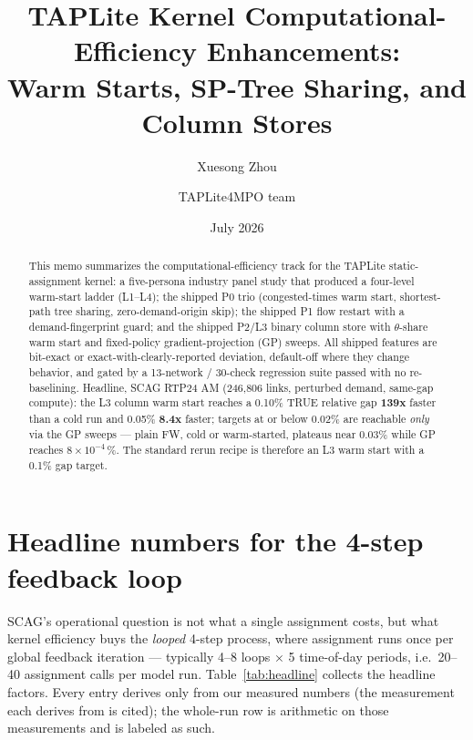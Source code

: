 \documentclass[10pt]{article}
\title{TAPLite Kernel Computational-Efficiency Enhancements:\\
Warm Starts, SP-Tree Sharing, and Column Stores}
\author{Xuesong Zhou \and TAPLite4MPO team}
\date{July 2026}
\begin{document}
\maketitle

\begin{abstract}
\noindent This memo summarizes the computational-efficiency track for the TAPLite
static-assignment kernel: a five-persona industry panel study that produced a
four-level warm-start ladder (L1--L4); the shipped P0 trio (congested-times warm
start, shortest-path tree sharing, zero-demand-origin skip); the shipped P1
flow restart with a demand-fingerprint guard; and the shipped P2/L3 binary
column store with $\theta$-share warm start and fixed-policy
gradient-projection (GP) sweeps. All shipped features are bit-exact or
exact-with-clearly-reported deviation, default-off where they change behavior,
and gated by a 13-network / 30-check regression suite passed with no
re-baselining. Headline, SCAG RTP24 AM (246{,}806 links, perturbed demand,
same-gap compute): the L3 column warm start reaches a 0.10\% TRUE relative gap
\textbf{139x} faster than a cold run and 0.05\% \textbf{8.4x} faster; targets
at or below 0.02\% are reachable \emph{only} via the GP sweeps --- plain FW,
cold or warm-started, plateaus near 0.03\% while GP reaches
$8\times10^{-4}$\,\%. The standard rerun recipe is therefore an L3 warm start
with a 0.1\% gap target.
\end{abstract}

\section{Headline numbers for the 4-step feedback loop}
\label{sec:headline}

SCAG's operational question is not what a single assignment costs, but what
kernel efficiency buys the \emph{looped} 4-step process, where assignment runs
once per global feedback iteration --- typically 4--8 loops $\times$ 5
time-of-day periods, i.e.\ 20--40 assignment calls per model run.
Table~\ref{tab:headline} collects the headline factors. Every entry derives
only from our measured numbers (the measurement each derives from is cited);
the whole-run row is arithmetic on those measurements and is labeled as such.
\end{document}
